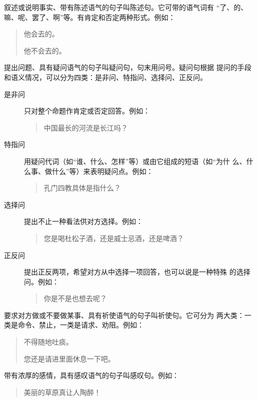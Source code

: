 \documentclass[final,oneside]{ctexbook}
\newenvironment{equotation}{\begin{quotation}\kaishu}{\end{quotation}}
\begin{document}
\begin{description}
  \item[陈述句] 叙述或说明事实、带有陈述语气的句子叫陈述句。它可带的语气词有
    “了、的、嘛、呢、罢了、啊”等。有肯定和否定两种形式。例如：
    \begin{equotation}
      他会去的。

      他不会去的。
    \end{equotation}

  \item[疑问句] 提出问题、具有疑问语气的句子叫疑问句，句末用问号。疑问句根据
    提问的手段和语义情况，可以分为四类：是非问、特指问、选择问、正反问。

    \begin{description}
      \item[是非问] 只对整个命题作肯定或否定回答。例如：
        \begin{equotation}
          中国最长的河流是长江吗？
        \end{equotation}

      \item[特指问] 用疑问代词（如“谁、什么、怎样”等）或由它组成的短语（如“为什
        么、什么事、做什么”等）来表明疑问点。例如：
        \begin{equotation}
          孔门四教具体是指什么？
        \end{equotation}

      \item[选择问] 提出不止一种看法供对方选择。例如：
        \begin{equotation}
          您是喝杜松子酒，还是威士忌酒，还是啤酒？
        \end{equotation}

      \item[正反问] 提出正反两项，希望对方从中选择一项回答，也可以说是一种特殊
        的选择问。例如：
        \begin{equotation}
          你是不是也想去呢？
        \end{equotation}

    \end{description}

  \item[祈使句] 要求对方做或不要做某事、具有祈使语气的句子叫祈使句。它可分为
    两大类：一类是命令、禁止，一类是请求、劝阻。例如：
    \begin{equotation}
      不得随地吐痰。

      您还是请进里面休息一下吧。
    \end{equotation}

  \item[感叹句] 带有浓厚的感情，具有感叹语气的句子叫感叹句。例如：
    \begin{equotation}
      美丽的草原真让人陶醉！
    \end{equotation}

\end{description}
\end{document}
